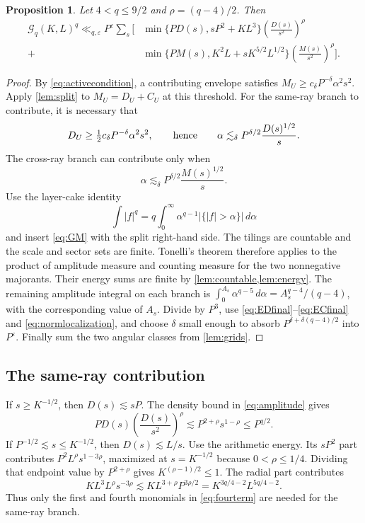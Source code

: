 \documentclass[11pt,reqno]{amsart}
\numberwithin{equation}{section}
\newtheorem{proposition}[proposition]{Proposition}
\theoremstyle{definition}
\theoremstyle{remark}
\newcommand{\eps}{\varepsilon}
\newcommand{\Gq}{\mathcal G_q}
\begin{document}
\begin{proposition}\label{prop:amplitude}
Let $4<q\le9/2$ and $\rho=(q-4)/2$. Then
\begin{equation}\label{eq:amplitude}
\begin{split}
 \Gq(K,L)^q\ll_{q,\eps}P^\eps\sum_s\Bigg[
 &\min\{PD(s),sP^2+KL^3\}
       \left(\frac{D(s)}{s^2}\right)^\rho\\
 {}+{}&\min\{PM(s),K^2L+sK^{5/2}L^{1/2}\}
       \left(\frac{M(s)}{s^2}\right)^\rho
 \Bigg].
\end{split}
\end{equation}
\end{proposition}
\begin{proof}
By \eqref{eq:activecondition}, a contributing envelope satisfies
$M_U\ge c_\delta P^{-\delta}\alpha^2s^2$.
Apply \cref{lem:split} to $M_U=D_U+C_U$ at this threshold.
For the same-ray branch to contribute, it is necessary that
\[
 D_U\ge\tfrac12c_\delta P^{-\delta}\alpha^2s^2,
 \qquad\hbox{hence}\qquad
 \alpha\lesssim_\delta P^{\delta/2}\frac{D(s)^{1/2}}s.
\]
The cross-ray branch can contribute only when
\[
 \alpha\lesssim_\delta P^{\delta/2}\frac{M(s)^{1/2}}s.
\]
Use the layer-cake identity
\[
 \int|f|^q=q\int_0^\infty\alpha^{q-1}|\{|f|>\alpha\}|\,d\alpha
\]
and insert \eqref{eq:GM} with the split right-hand side.
The tilings are countable and the scale and sector sets are finite. Tonelli's theorem therefore applies to the product of amplitude measure and counting measure for the two nonnegative majorants. Their energy sums are finite by \cref{lem:countable,lem:energy}.
The remaining amplitude integral on each branch is
$\int_0^{A_s}\alpha^{q-5}\,d\alpha=A_s^{q-4}/(q-4)$, with the corresponding value of $A_s$.
Divide by $P^3$, use \eqref{eq:EDfinal}--\eqref{eq:ECfinal} and \eqref{eq:normlocalization}, and choose $\delta$ small enough to absorb $P^{\delta+\delta(q-4)/2}$ into $P^\eps$.
Finally sum the two angular classes from \cref{lem:grids}.
\end{proof}

\subsection{The same-ray contribution}
If $s\ge K^{-1/2}$, then $D(s)\lesssim sP$.
The density bound in \eqref{eq:amplitude} gives
\begin{equation}\label{eq:largeD}
 PD(s)\left(\frac{D(s)}{s^2}\right)^\rho
 \lesssim P^{2+\rho}s^{1-\rho}\le P^{q/2}.
\end{equation}
If $P^{-1/2}\lesssim s\le K^{-1/2}$, then $D(s)\lesssim L/s$.
Use the arithmetic energy.
Its $sP^2$ part contributes $P^2L^\rho s^{1-3\rho}$, maximized at $s=K^{-1/2}$ because $0<\rho\le1/4$.
Dividing that endpoint value by $P^{2+\rho}$ gives $K^{(\rho-1)/2}\le1$.
The radial part contributes
\begin{equation}\label{eq:radialterm}
 KL^3L^\rho s^{-3\rho}
 \lesssim KL^{3+\rho}P^{3\rho/2}
 =K^{3q/4-2}L^{5q/4-2}.
\end{equation}
Thus only the first and fourth monomials in \eqref{eq:fourterm} are needed for the same-ray branch.
\end{document}

